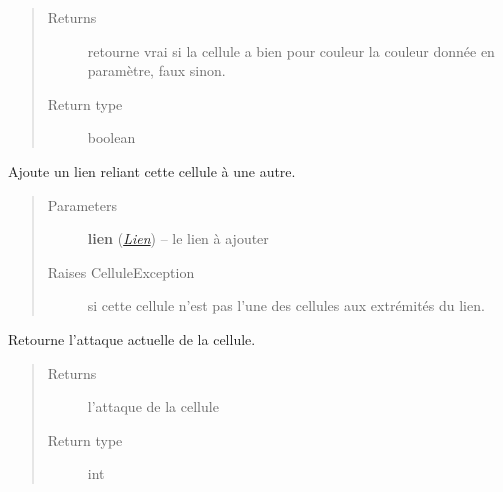 \documentclass[letterpaper,10pt,english]{sphinxmanual}
\begin{document}
\begin{fulllineitems}
\begin{fulllineitems}
\begin{quote}
\begin{description}
\item[{Returns}] \leavevmode
retourne vrai si la cellule a bien pour couleur la couleur donnée en paramètre, faux sinon.

\item[{Return type}] \leavevmode
boolean

\end{description}\end{quote}

\end{fulllineitems}


\begin{fulllineitems}
\label{index:Cellule.Cellule.ajouterLien}
Ajoute un lien reliant cette cellule à une autre.
\begin{quote}\begin{description}
\item[{Parameters}] \leavevmode
\textbf{lien} ({\hyperref[index:module-Lien]{\emph{Lien}}}) -- le lien à ajouter

\item[{Raises CelluleException}] \leavevmode
si cette cellule n'est pas l'une des cellules aux extrémités du lien.

\end{description}\end{quote}

\end{fulllineitems}


\begin{fulllineitems}
\label{index:Cellule.Cellule.getAttaque}
Retourne l'attaque actuelle de la cellule.
\begin{quote}\begin{description}
\item[{Returns}] \leavevmode
l'attaque de la cellule

\item[{Return type}] \leavevmode
int

\end{description}\end{quote}

\end{fulllineitems}



\end{fulllineitems}
\end{document}
